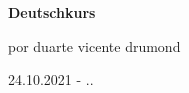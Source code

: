 \thispagestyle {empty} %

\begin{flushleft}
    
    \vspace*{\fill}
    
    \textbf{\huge Deutschkurs}\par
    
    {por duarte vicente drumond}\par\vspace{1cm}
    
    {24.10.2021  - \the\day.\the\month.\the\year}\par\vspace{1cm}
    
    \vspace*{\fill}
        
\end{flushleft}